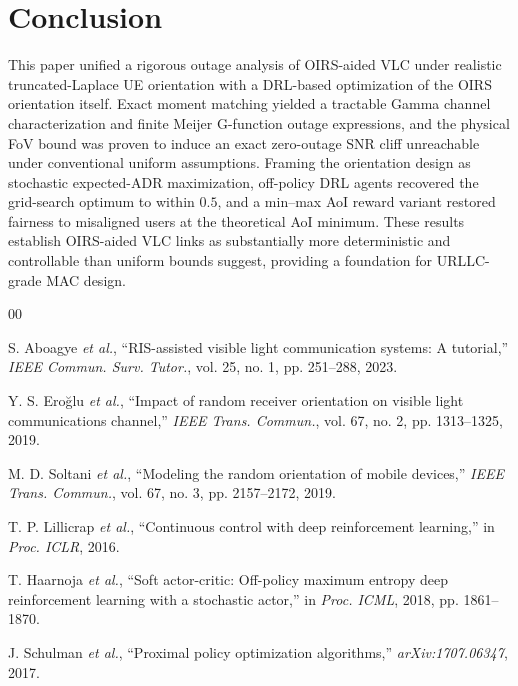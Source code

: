 \documentclass[conference]{IEEEtran}
\begin{document}
\section{Conclusion}
This paper unified a rigorous outage analysis of OIRS-aided VLC under
realistic truncated-Laplace UE orientation with a DRL-based optimization of
the OIRS orientation itself. Exact moment matching yielded a tractable Gamma
channel characterization and finite Meijer G-function outage expressions, and
the physical FoV bound was proven to induce an exact zero-outage SNR cliff
unreachable under conventional uniform assumptions. Framing the orientation
design as stochastic expected-ADR maximization, off-policy DRL agents
recovered the grid-search optimum to within $0.5$, and a min--max AoI
reward variant restored fairness to misaligned users at the theoretical AoI
minimum. These results establish OIRS-aided VLC links as substantially more
deterministic and controllable than uniform bounds suggest, providing a
foundation for URLLC-grade MAC design.


\begin{thebibliography}{00}

S. Aboagye \emph{et al.}, ``RIS-assisted visible light communication systems:
A tutorial,'' \emph{IEEE Commun. Surv. Tutor.}, vol. 25, no. 1, pp. 251--288,
2023.

Y. S. Ero\u{g}lu \emph{et al.}, ``Impact of random receiver orientation on
visible light communications channel,'' \emph{IEEE Trans. Commun.}, vol. 67,
no. 2, pp. 1313--1325, 2019.

M. D. Soltani \emph{et al.}, ``Modeling the random orientation of mobile
devices,'' \emph{IEEE Trans. Commun.}, vol. 67, no. 3, pp. 2157--2172, 2019.

T. P. Lillicrap \emph{et al.}, ``Continuous control with deep reinforcement
learning,'' in \emph{Proc. ICLR}, 2016.

T. Haarnoja \emph{et al.}, ``Soft actor-critic: Off-policy maximum entropy
deep reinforcement learning with a stochastic actor,'' in \emph{Proc. ICML},
2018, pp. 1861--1870.

J. Schulman \emph{et al.}, ``Proximal policy optimization algorithms,''
\emph{arXiv:1707.06347}, 2017.

\end{thebibliography}
\end{document}

